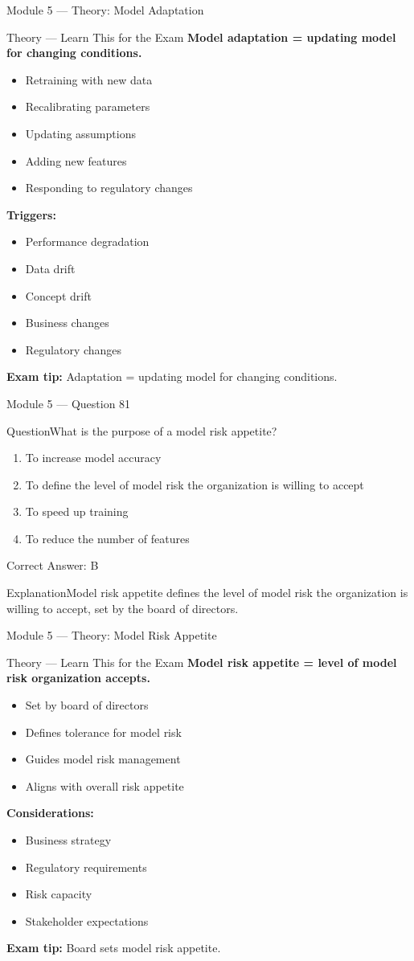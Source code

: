 \documentclass[aspectratio=169,10pt]{beamer}
\newcommand{\question}[1]{\begin{block}{Question}#1\end{block}}
\newcommand{\options}[4]{%
	\begin{enumerate}[label=\Alph*.,leftmargin=*]
		\item #1
		\item #2
		\item #3
		\item #4
	\end{enumerate}
}
\newcommand{\answerbox}[1]{\begin{exampleblock}{Correct Answer: #1}\end{exampleblock}}
\newcommand{\explain}[1]{\begin{block}{Explanation}#1\end{block}}
\newcommand{\theory}[1]{%
	\begin{block}{Theory --- Learn This for the Exam}
		\small #1
	\end{block}
}
\begin{document}
	\begin{frame}{Module 5 --- Theory: Model Adaptation}
		\theory{
			\textbf{Model adaptation = updating model for changing conditions.}
			\begin{itemize}
				\item Retraining with new data
				\item Recalibrating parameters
				\item Updating assumptions
				\item Adding new features
				\item Responding to regulatory changes
			\end{itemize}
			\textbf{Triggers:}
			\begin{itemize}
				\item Performance degradation
				\item Data drift
				\item Concept drift
				\item Business changes
				\item Regulatory changes
			\end{itemize}
			\textbf{Exam tip:} Adaptation = updating model for changing conditions.
		}
	\end{frame}
	
	\begin{frame}{Module 5 --- Question 81}
		\question{What is the purpose of a model risk appetite?}
		\options{To increase model accuracy}{To define the level of model risk the organization is willing to accept}{To speed up training}{To reduce the number of features}
		\answerbox{B}
		\explain{Model risk appetite defines the level of model risk the organization is willing to accept, set by the board of directors.}
	\end{frame}
	
	\begin{frame}{Module 5 --- Theory: Model Risk Appetite}
		\theory{
			\textbf{Model risk appetite = level of model risk organization accepts.}
			\begin{itemize}
				\item Set by board of directors
				\item Defines tolerance for model risk
				\item Guides model risk management
				\item Aligns with overall risk appetite
			\end{itemize}
			\textbf{Considerations:}
			\begin{itemize}
				\item Business strategy
				\item Regulatory requirements
				\item Risk capacity
				\item Stakeholder expectations
			\end{itemize}
			\textbf{Exam tip:} Board sets model risk appetite.
		}
	\end{frame}
	
\end{document}
